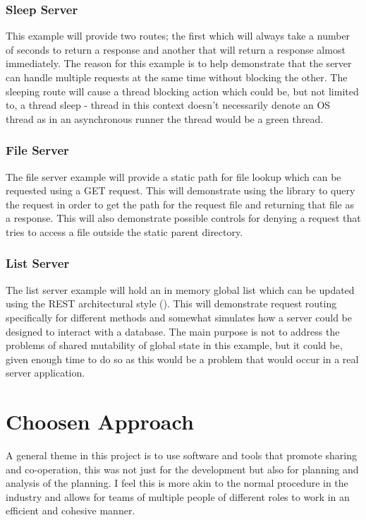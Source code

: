 \documentclass[12pt, a4paper]{article}
\begin{document}
\subsubsection{Sleep Server}

This example will provide two routes; the first which will always take a number of seconds to return
a response and another that will return a response almost immediately. The reason for this example is
to help demonstrate that the server can handle multiple requests at the same time without blocking
the other. The sleeping route will cause a thread blocking action which could be, but not limited to,
a thread sleep - thread in this context doesn't necessarily denote an OS thread as in an asynchronous
runner the thread would be a green thread.

\subsubsection{File Server}

The file server example will provide a static path for file lookup which can be requested using a
GET request. This will demonstrate using the library to query the request in order to get
the path for the request file and returning that file as a response. This will also demonstrate
possible controls for denying a request that tries to access a file outside the static parent
directory.

\subsubsection{List Server}

The list server example will hold an in memory global list which can be updated using the REST
architectural style (\cite{rest}).
This will demonstrate request routing specifically for different methods and somewhat simulates how
a server could be designed to interact with a database. The main purpose is not to address the problems
of shared mutability of global state in this example, but it could be, given enough time to do so as
this would be a problem that would occur in a real server application.

\section{Choosen Approach} \label{sec:choosen-approach}

A general theme in this project is to use software and tools that promote sharing and
co-operation, this was not just for the development but also for planning and analysis of the
planning. I feel this is more akin to the normal procedure in the industry and allows for teams of
multiple people of different roles to work in an efficient and cohesive manner.
\end{document}
